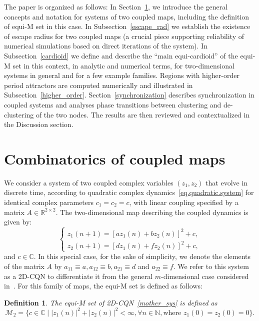 \documentclass[10pt]{article}
\newtheorem{defn}[thm]{Definition}
\begin{document}
The paper is organized as follows: In Section~\ref{combinatorics}, we introduce the general concepts and notation for systems of two coupled maps, including the definition of equi-M set in this case. In Subsection~\ref{escape_rad} we establish the existence of escape radius for two coupled maps (a crucial piece supporting reliability of numerical simulations based on direct iterations of the system). In Subsection~\ref{cardioid} we define and describe the ``main equi-cardioid'' of the equi-M set in this context, in analytic and numerical terms, for two-dimensional systems in general and for a few example families. Regions with higher-order period attractors are computed numerically and illustrated in Subsection~\ref{higher_order}. Section~\ref{synchronization} describes synchronization in coupled systems and analyses phase transitions between clustering and de-clustering of the two nodes. The results are then reviewed and contextualized in the Discussion section.

\section{Combinatorics of coupled maps}
\label{combinatorics}

We consider a system of two coupled complex variables $(z_1, z_2)$ that evolve in discrete time, according to quadratic complex dynamics~\eqref{eq.quadratic.system} for identical complex parameters $c_1=c_2=c$, with linear coupling specified by a matrix $A \in \mathbb{R}^{2 \times 2}$. The two-dimensional map describing the coupled dynamics is given by:
\begin{equation} \label{mother_sys}
\begin{cases}
z_1(n+1) = [a z_1(n) + b z_2(n)]^2 + c, \\
z_2(n+1) = [d z_1(n) + f z_2(n)]^2 + c,
\end{cases}
\end{equation}
and $c \in \mathbb{C}$. In this special case, for the sake of simplicity, we denote the elements of the matrix $A$ by $a_{11} \equiv a, a_{12} \equiv b, a_{21} \equiv d$ and $a_{22} \equiv f$. We refer to this system as a 2D-CQN to differentiate it from the general $m$-dimensional case considered in~\cite{AC2,Simone}. For this family of maps, the equi-M set is defined as follows:

\begin{defn} \label{def:equi_m_set}
The equi-M set of 2D-CQN~\eqref{mother_sys} is defined as
\[
\mathcal{M}_{2} = \{
    c \in \mathbb{C} \mid
    |z_1(n)|^2 + |z_2(n)|^2 < \infty, \forall n \in \mathbb{N},
    \text{where } z_1(0) = z_2(0) = 0
\}.
\]
\end{defn}
\end{document}
